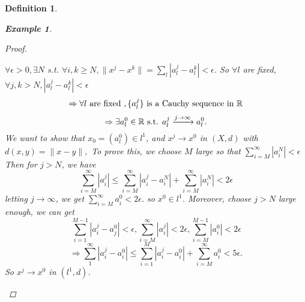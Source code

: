 \documentclass{article}
\newtheorem*{definition}{Definition}
\newtheorem*{example}{Example}
\begin{document}
\begin{definition}
\begin{example}
\begin{enumerate}
\begin{proof}
\begin{itemize}
                    $\forall \epsilon > 0, \exists N$ s.t. $\forall i, k \ge N, \|x^j - x^k\| = \sum_{l}|a_l^j - a_l^k| < \epsilon$.
                    So $\forall l$ are fixed, $\forall j, k > N, |a_l^j - a_l^k| < \epsilon$
                    \[
                       \Rightarrow \forall l \textnormal{ are fixed }, \{a_l^j\} \textnormal{ is a Cauchy sequence in }\mathbb{R} 
                    \]
                    \[
                        \Rightarrow \exists a_l^0 \in \mathbb{R} \textnormal{ s.t. } a_l^j \xrightarrow{j \rightarrow \infty} a_l^0.
                    \]
                    We want to show that $x_0=(a_l^0) \in l^1$, and $x^j \rightarrow x^0$ in $(X, d)$ with $d(x, y) = \|x -y\|, $
                    To prove this, we choose $M$ large so that $\sum_{i=M}^{\infty}{|a_i^N|} < \epsilon$
                    Then for $j > N$, we have
                    \[
                        \sum_{i=M}^{\infty}{|a_i^j|} \le \sum_{i=M}^{\infty}{|a_i^j - a_i^N| + \sum_{i=M}^{\infty}{|a_i^N|}} < 2 \epsilon
                    \]
                    letting $j \rightarrow \infty$, we get $\sum_{i=M}^{\infty}{a_i^0} < 2 \epsilon$. so $x^0 \in l^1$.
                    Moreover, choose $j > N$ large enough, we can get
                    \[
                        \sum_{i=1}^{M-1}{|a_i^j - a_j^0|} < \epsilon,
                        \sum_{i=M}^{\infty}{|a_i^j|} < 2\epsilon,
                        \sum_{i=M}^{M-1}{|a_i^0|} < 2\epsilon
                    \]
                    \[
                        \Rightarrow \sum_{1}^{\infty}{|a_i^j - a_i^0|} \le \sum_{i=1}^{M}{|a_i^j - a_i^0|} + \sum_{i=M}^{\infty}{a_i^0} < 5 \epsilon.
                    \]
                    So $x^j \rightarrow x^0$ in $(l^1, d)$.
                \end{itemize}        
            \end{proof}
        \end{enumerate}
    \end{example}
\end{definition}
\end{document}
